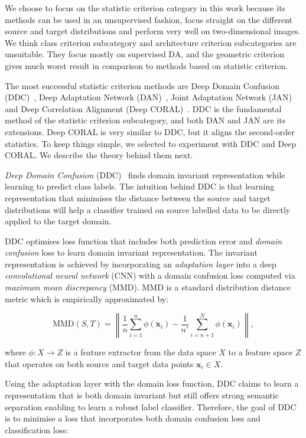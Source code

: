 We choose to focus on the statistic criterion category in this work
because its methods can be used in an unsupervised fashion,
focus straight on the different source and target distributions
and perform very well on two-dimensional images.
We think class criterion subcategory and architecture criterion subcategories are unsuitable.
They focus mostly on supervised DA, and the geometric criterion gives much worst result in comparison to methods based on statistic criterion.

The most successful statistic criterion methods are Deep Domain Confusion (DDC)~\cite{tzeng2014}, Deep Adaptation Network (DAN)~\cite{long2015}, Joint Adaptation Network (JAN)~\cite{long2017} and Deep Correlation Alignment (Deep CORAL)~\cite{sun2016}.
DDC is the fundamental method of the statistic criterion subcategory,
and both DAN and JAN are its extensions.
Deep CORAL is very similar to DDC, but it aligns the second-order statistics.
To keep things simple, we selected to experiment with DDC and Deep CORAL.
We describe the theory behind them next.

\textit{Deep Domain Confusion} (DDC)~\cite{tzeng2014} finds domain invariant representation
while learning to predict class labels.
The intuition behind DDC is that learning representation
that minimises the distance between the source and target distributions
will help a classifier trained on source labelled data
to be directly applied to the target domain.

DDC optimises loss function that includes both prediction error and \textit{domain confusion} loss to learn domain invariant representation.
The invariant representation is achieved by incorporating an \textit{adaptation layer} into a deep \textit{convolutional neural network} (CNN)
with a domain confusion loss computed via \textit{maximum mean discrepancy} (MMD).
MMD is a standard distribution distance metric which is empirically approximated by:

\begin{equation}
	\mathrm{MMD}(S, T) = \left\|
	\frac{1}{n} \sum_{i = 1}^{n} \phi(\mathbf{x}_i) -
	\frac{1}{n'} \sum_{i = n + 1}^{N} \phi(\mathbf{x}_i)
	\right\|,
	\label{maximam_mean_discrepancy}
\end{equation}

where \(\phi: X \to Z\) is a feature extractor
from the data space \(X\) to a feature space \(Z\)
that operates on both source and target data points \(\mathbf{x}_i \in X\).

Using the adaptation layer with the domain loss function, DDC claims to learn a representation
that is both domain invariant but still offers strong semantic separation enabling to learn a robust label classifier.
Therefore, the goal of DDC is to minimise a loss that incorporates both domain confusion loss and classification loss:

